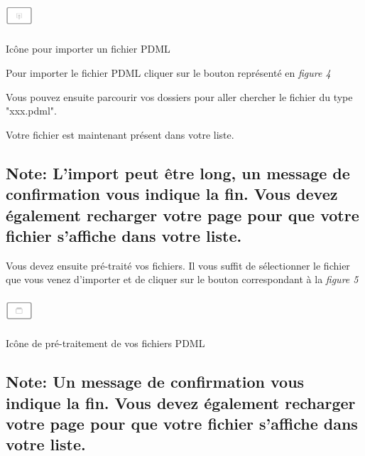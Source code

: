 \documentclass[a4paper,10pt,justified,openany]{tufte-book}
\begin{document}
\begin{marginfigure}
\includegraphics[width=1cm, height=1cm]{./images/importpdml.png}
\label{iconevueapprentissage}
\caption{Icône pour importer un fichier PDML}
\end{marginfigure}

Pour importer le fichier PDML cliquer sur le bouton représenté en {\itshape figure 4} 



Vous pouvez ensuite parcourir vos dossiers pour aller chercher le fichier du type "xxx.pdml".

Votre fichier est maintenant présent dans votre liste. 

\subsection{Note: L'import peut être long, un message de confirmation vous indique la fin. Vous devez également recharger votre page pour que votre fichier s'affiche dans votre liste.}



Vous devez ensuite pré-traité vos fichiers. Il vous suffit de sélectionner le fichier que vous venez d'importer et de cliquer sur le bouton correspondant à la {\itshape figure 5}

\begin{marginfigure}
\includegraphics[width=1cm, height=1cm]{./images/pretraitementpdml.png}
\label{iconevueapprentissage}
\caption{Icône de pré-traitement de vos fichiers PDML}
\end{marginfigure}

\subsection{Note: Un message de confirmation vous indique la fin. Vous devez également recharger votre page pour que votre fichier s'affiche dans votre liste.}
\end{document}

